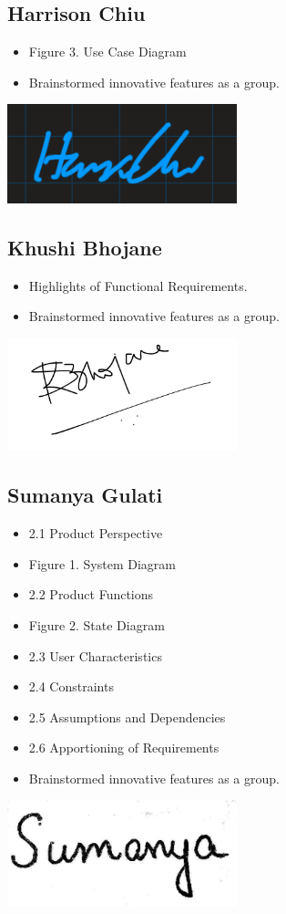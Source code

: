 \documentclass[]{article}
\begin{document}
\subsection{Harrison Chiu}
\label{subsec:harrison_chiu}
\begin{itemize}
 	\item Figure 3. Use Case Diagram
   	\item Brainstormed innovative features as a group.
 \end{itemize}
 \includegraphics[width=0.5\textwidth]{harrison.png}


\subsection{Khushi Bhojane}
\label{subsec:khushi_bhojane}
\begin{itemize}
	\item Highlights of Functional Requirements.
	\item Brainstormed innovative features as a group.
\end{itemize}
\includegraphics[width=0.5\textwidth]{khushi_signature.png}

\subsection{Sumanya Gulati}
\label{subsec:sumanya_gulati}
\begin{itemize}
	\item 2.1 Product Perspective
	\item Figure 1. System Diagram
	\item 2.2 Product Functions
	\item Figure 2. State Diagram
	\item 2.3 User Characteristics
	\item 2.4 Constraints
	\item 2.5 Assumptions and Dependencies
	\item 2.6 Apportioning of Requirements
	\item Brainstormed innovative features as a group.
\end{itemize}
\includegraphics[width=0.5\textwidth]{signature.jpeg}
\end{document}
